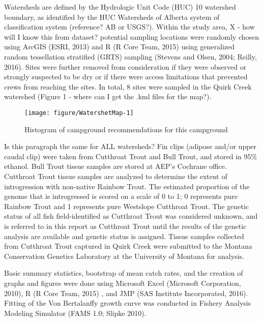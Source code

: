 \documentclass[]{article}\usepackage[]{graphicx}\usepackage[]{color}
\makeatletter
\def\maxwidth{ %
  \ifdim\Gin@nat@width>\linewidth
    \linewidth
  \else
    \Gin@nat@width
  \fi
}
\newenvironment{knitrout}{}{} %
\makeatother
\begin{document}
Watersheds are defined by the Hydrologic Unit Code (HUC) 10 watershed boundary, 
as identified by the HUC Watersheds of Alberta system of classification system 
(reference? AB or USGS?). 
Within the study area, {\LARGE X - how will I know this from dataset?} potential sampling locations were randomly 
chosen using ArcGIS (ESRI, 2013) and R (R Core Team, 2015) 
using generalized random tessellation stratified (GRTS) 
sampling (Stevens and Olsen, 2004; Reilly, 2016). 
Sites were further removed from consideration if they were observed or 
strongly suspected to be dry or if there were access limitations that prevented crews from reaching the sites. 
In total, 8 sites were sampled in the Quirk Creek watershed 
({\LARGE Figure 1 - where can I get the .kml files for the map?}). 

\begin{figure}[h]
\begin{center}
\begin{knitrout}
\color{fgcolor}
\texttt{[image: figure/WatershetMap-1]} 

\end{knitrout}
\end{center}
\caption{Histogram of campground recommendations for this campground}
\label{fig:recommendhist}
\end{figure}


{\Large Is this paragraph the same for ALL watersheds?}
Fin clips (adipose and/or upper caudal clip) were taken from Cutthroat Trout and Bull Trout, and stored in 95\% ethanol. 
Bull Trout tissue samples are stored at AEP’s Cochrane office. 
Cutthroat Trout tissue samples are analyzed to determine the extent 
of introgression with non-native Rainbow Trout. 
The estimated proportion of the genome that is introgressed is scored on a scale of 0 to 1; 
0 represents pure Rainbow Trout and  1 represents pure Westslope Cutthroat Trout. 
The genetic status of all fish field-identified as Cutthroat Trout 
was considered unknown, and is referred to in this report as Cutthroat Trout until the results of the genetic analysis are available and genetic status is assigned. 
Tissue samples collected from Cutthroat Trout captured in Quirk Creek
were submitted to the Montana Conservation Genetics Laboratory 
at the University of Montana for analysis.

Basic summary statistics, bootstrap of mean catch rates, 
and the creation of graphs and figures were done using Microsoft Excel (Microsoft Corporation, 2010),  
R (R Core Team, 2015) , and JMP (SAS Institute Incorporated, 2016). 
Fitting of the Von Bertalanffy growth curve was conducted in Fishery Analysis Modeling Simulator (FAMS 1.0; Slipke 2010). 
\end{document}
